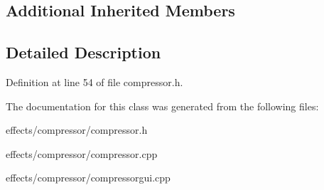 \subsection*{Additional Inherited Members}


\subsection{Detailed Description}


Definition at line 54 of file compressor.\+h.



The documentation for this class was generated from the following files\+:\begin{DoxyCompactItemize}
\item 
effects/compressor/compressor.\+h\item 
effects/compressor/compressor.\+cpp\item 
effects/compressor/compressorgui.\+cpp\end{DoxyCompactItemize}
